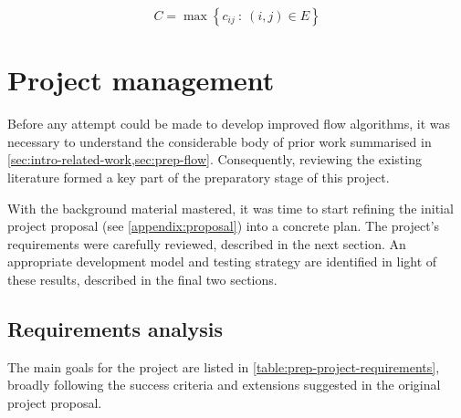 \begin{equation}
C=\max\left\{ c_{ij}\::\:(i,j)\in E\right\} 
\end{equation}

\section{Project management}

Before any attempt could be made to develop improved flow algorithms, it was necessary to understand the considerable body of prior work  summarised in \cref{sec:intro-related-work,sec:prep-flow}. Consequently, reviewing the existing literature formed a key part of the preparatory stage of this project. 

With the background material mastered, it was time to start refining the initial project proposal (see \cref{appendix:proposal}) into a concrete plan. The project's requirements were carefully reviewed, described in the next section. An appropriate development model and testing strategy are identified in light of these results, described in the final two sections.

\subsection{Requirements analysis} \label{sec:prep-management-requirements}



The main goals for the project are listed in \cref{table:prep-project-requirements}, broadly following the success criteria and extensions suggested in the original project proposal.

